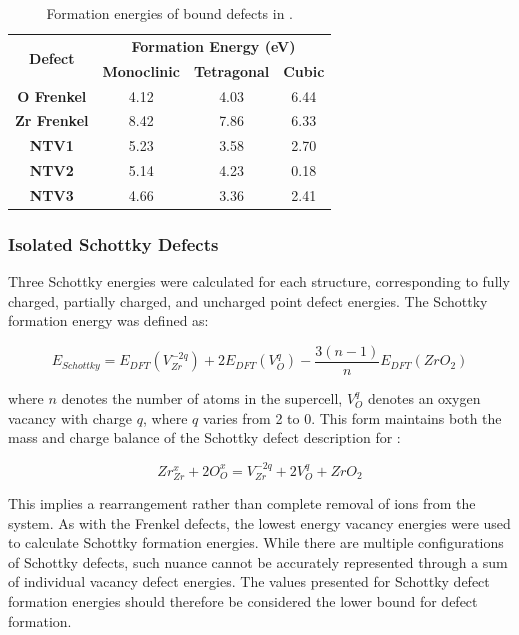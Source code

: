 \begin{table}[ht] %
\onehalfspacing
\centering
\caption{Formation energies of bound defects in \zirconia.}
\label{table:bound_defects}
\begin{tabular}{cccc}
\hline
\multirow{2}{*}{\textbf{Defect}} & \multicolumn{3}{c}{\textbf{Formation Energy (eV)}} \\ \cline{2-4} 
 & \textbf{Monoclinic} & \textbf{Tetragonal} & \textbf{Cubic} \\ \hline
\textbf{O Frenkel} & 4.12 & 4.03 & 6.44 \\
\textbf{Zr Frenkel} & 8.42 & 7.86 & 6.33 \\
\textbf{NTV1} & 5.23 & 3.58 & 2.70 \\
\textbf{NTV2} & 5.14 & 4.23 & 0.18 \\
\textbf{NTV3} & 4.66 & 3.36 & 2.41 \\ \hline
\end{tabular}
\end{table}

\subsubsection*{Isolated Schottky Defects}

Three Schottky energies were calculated for each structure, corresponding to fully charged, partially charged, and uncharged point defect energies. The Schottky formation energy was defined as:

\begin{equation}
\label{equation_schottky}
E_{Schottky} = E_{DFT}(V^{-2q}_{Zr}) + 2E_{DFT}(V^{q}_{O}) -\frac{3(n-1)}{n}E_{DFT}(ZrO_2)%
\end{equation}

where $n$ denotes the number of atoms in the supercell, $V^{q}_{O}$ denotes an oxygen vacancy with charge $q$, where $q$ varies from 2 to 0. This form maintains both the mass and charge balance of the Schottky defect description for \zirconia :

\begin{equation}
\label{generic_schottky}
Zr^{x}_{Zr} + 2O^{x}_{O} = V^{-2q}_{Zr} + 2V^{q}_{O} + ZrO_{2}
\end{equation}

This implies a rearrangement rather than complete removal of ions from the system. As with the Frenkel defects, the lowest energy vacancy energies were used to calculate Schottky formation energies. While there are multiple configurations of Schottky defects, such nuance cannot be accurately represented through a sum of individual vacancy defect energies. The values presented for Schottky defect formation energies should therefore be considered the lower bound for defect formation. 

